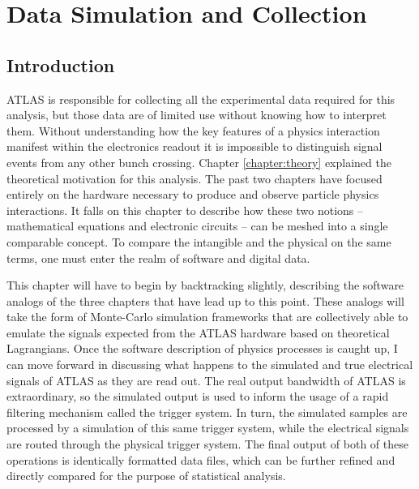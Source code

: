 \chapter{Data Simulation and Collection} \label{chapter:data}

\section{Introduction}
    
    ATLAS is responsible for collecting all the experimental data required for this analysis,
        but those data are of limited use without knowing how to interpret them.
    Without understanding how the key features of a physics interaction manifest within the electronics readout
        it is impossible to distinguish signal events from any other bunch crossing.
    Chapter \ref{chapter:theory} explained the theoretical motivation for this analysis.
    The past two chapters have focused entirely on the hardware necessary to produce and observe particle physics interactions.
    It falls on this chapter to describe how these two notions --
        mathematical equations and electronic circuits -- can be meshed into a single comparable concept.
    To compare the intangible and the physical on the same terms,
        one must enter the realm of software and digital data.

    This chapter will have to begin by backtracking slightly,
        describing the software analogs of the three chapters that have lead up to this point.
    These analogs will take the form of Monte-Carlo simulation frameworks
        that are collectively able to emulate the signals expected from the ATLAS hardware
        based on theoretical Lagrangians.
    Once the software description of physics processes is caught up,
        I can move forward in discussing what happens to the
        simulated and true electrical signals of ATLAS as they are read out.
    The real output bandwidth of ATLAS is extraordinary,
        so the simulated output is used to inform the usage of
        a rapid filtering mechanism called the trigger system.
    In turn, the simulated samples are processed by a simulation of this same trigger system,
        while the electrical signals are routed through the physical trigger system.
    The final output of both of these operations is identically formatted data files,
        which can be further refined and directly compared for the purpose of statistical analysis.
        

\FloatBarrier

